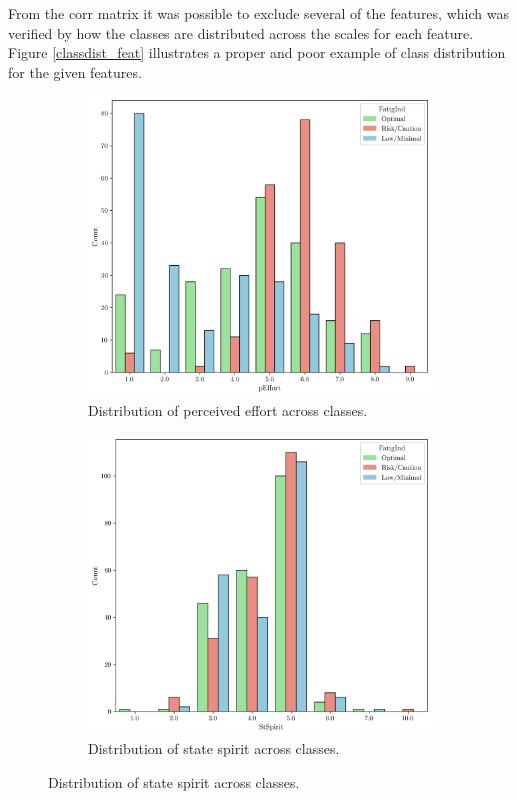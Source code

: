\documentclass[conference]{IEEEtran}
\begin{document}
From the corr matrix it was possible to exclude several of the features, which was verified by how the classes are distributed across the scales for each feature. Figure \ref{classdist_feat} illustrates a proper and poor example of class distribution for the given features.

\begin{figure}[H]
    \centering
    \begin{subfigure}[1]{\linewidth}
        \centering
        \includegraphics[width=\linewidth]{assets/distribution_pEffort.png}
        \caption{Distribution of perceived effort across classes.}
        \label{fig:subfig-a}
    \end{subfigure}
    
    \vspace{0.5cm}

    \begin{subfigure}[2]{\linewidth}
        \centering
        \includegraphics[width=\linewidth]{assets/distribution_StSpirit.png}
        \caption{Distribution of state spirit across classes.}
        \label{fig:subfig-b}
    \end{subfigure}
    

\end{figure}
\end{document}
